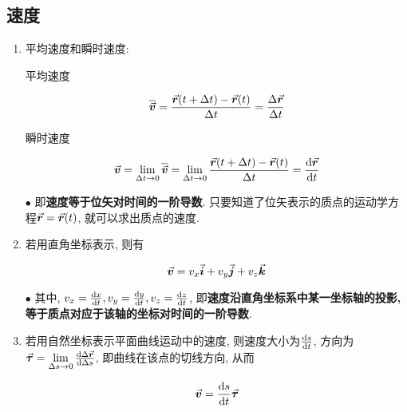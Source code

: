 \subsection{速度}

\begin{enumerate}
	
	\item 平均速度和瞬时速度: 
	
	\begin{definition} \label{C1-df3}
		
		平均速度
		
		\begin{equation}
			\overline{\va*{v}} = \dfrac{\va*{r}(t + \Delta t) - \va*{r}(t)}{\Delta t} = \dfrac{\Delta \va*{r}}{\Delta t} 
			\label{C1-eq7}
		\end{equation}
		
		瞬时速度
		
		\begin{equation}
			\va*{v} = \lim\limits_{\Delta t \to 0} \overline{\va*{v}} = \lim\limits_{\Delta t \to 0} \dfrac{\va*{r}(t + \Delta t) - \va*{r}(t)}{\Delta t} = \dv{\va*{r}}{t}
			\label{C1-eq8}
		\end{equation}
		
	\end{definition}
	
	$\bullet$ 即\textbf{速度等于位矢对时间的一阶导数}. 只要知道了位矢表示的质点的运动学方程$\va*{r} = \va*{r}(t)$, 就可以求出质点的速度. 
	
	\item 若用直角坐标表示, 则有
	
	\begin{equation}
		\va*{v} = v_x \va*{i} + v_y \va*{j} + v_z \va*{k} \label{C1-eq9}
	\end{equation}
	
	$\bullet$ 其中, $v_x = \dv{x}{t}, v_y = \dv{y}{t}, v_z = \dv{z}{t}$, 即\textbf{速度沿直角坐标系中某一坐标轴的投影, 等于质点对应于该轴的坐标对时间的一阶导数}. 
	
	\item 若用自然坐标表示平面曲线运动中的速度, 则速度大小为$\dv{s}{t}$, 方向为$\va*{\tau} = \lim\limits_{\Delta s \to 0} \dv{\Delta \va*{r}}{\Delta s}$, 即曲线在该点的切线方向, 从而
	
	\begin{equation}
		\va*{v} = \dv{s}{t} \va*{\tau} \label{C1-eq10}
	\end{equation}
	
\end{enumerate}


